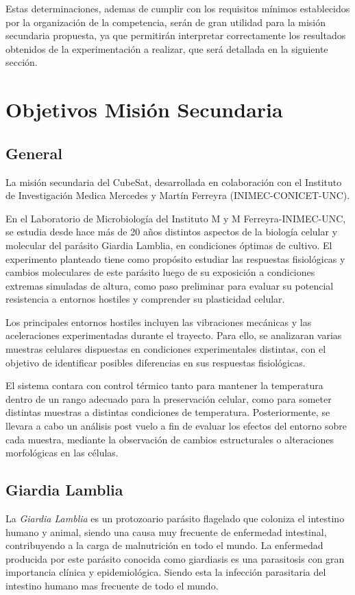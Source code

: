 Estas determinaciones, ademas de cumplir con los requisitos mínimos establecidos por la
organización de la competencia, serán de gran utilidad para la misión secundaria propuesta,
ya que permitirán interpretar correctamente los resultados obtenidos de la experimentación
a realizar, que será detallada en la siguiente sección.

\section{Objetivos Misión Secundaria}
  \subsection{General}
    La misión secundaria del CubeSat, desarrollada en colaboración con el Instituto de Investigación
    Medica Mercedes y Martín Ferreyra (INIMEC-CONICET-UNC).

    En el Laboratorio de Microbiología del Instituto M y M Ferreyra-INIMEC-UNC, se estudia desde hace más de 20 años
    distintos aspectos de la biología celular y molecular del parásito Giardia Lamblia, en condiciones óptimas de
    cultivo. El experimento planteado tiene como propósito estudiar las respuestas fisiológicas y cambios moleculares
    de este parásito luego de su exposición a condiciones extremas simuladas de altura, como paso preliminar para
    evaluar su potencial resistencia a entornos hostiles y comprender su plasticidad celular.

    Los principales entornos hostiles incluyen las vibraciones mecánicas y
    las aceleraciones experimentadas durante el trayecto. Para ello, se analizaran varias muestras
    celulares dispuestas en condiciones experimentales distintas, con el objetivo de identificar
    posibles diferencias en sus respuestas fisiológicas.

    El sistema contara con control térmico tanto para mantener la temperatura dentro de
    un rango adecuado para la preservación celular, como para someter distintas muestras a
    distintas condiciones de temperatura. Posteriormente, se llevara a cabo un análisis post vuelo a
    fin de evaluar los efectos del entorno sobre cada muestra, mediante la observación de
    cambios estructurales o alteraciones morfológicas en las células.


  \subsection{Giardia Lamblia}
    La \textit{Giardia Lamblia} es un protozoario parásito flagelado que coloniza el intestino humano
    y animal, siendo una causa muy frecuente de enfermedad intestinal, contribuyendo a la carga
    de malnutrición en todo el mundo. La enfermedad producida por este parásito conocida
    como giardiasis es una parasitosis con gran importancia clínica y epidemiológica. Siendo esta
    la infección parasitaria del intestino humano mas frecuente de todo el mundo.

